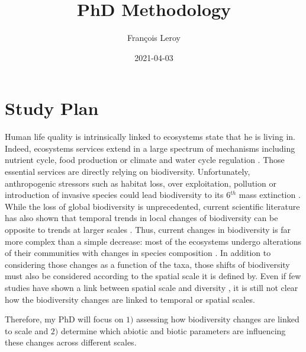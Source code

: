 \documentclass[
  12pt,
  oneside]{report}
\title{PhD Methodology}
\author{François Leroy}
\date{2021-04-03}
\begin{document}
\maketitle

\cleardoublepage 
{}

{
\setcounter{tocdepth}{1}
\tableofcontents
}
\listoffigures
\listoftables
{}


\cleardoublepage 
{}


\hypertarget{study-plan}{%
\chapter{Study Plan}\label{study-plan}}

Human life quality is intrinsically linked to ecosystems state that he is living in. Indeed, ecosystems services extend in a large spectrum of mechanisms including nutrient cycle, food production or climate and water cycle regulation \autocite{pereira_global_2012}. Those essential services are directly relying on biodiversity. Unfortunately, anthropogenic stressors such as habitat loss, over exploitation, pollution or introduction of invasive species could lead biodiversity to its 6\(^{th}\) mass extinction \autocite{barnosky_has_2011}. While the loss of global biodiversity is unprecedented, current scientific literature has also shown that temporal trends in local changes of biodiversity can be opposite to trends at larger scales \autocite{chase_species_2019}. Thus, current changes in biodiversity is far more complex than a simple decrease: most of the ecosystems undergo alterations of their communities with changes in species composition \autocite{blowes_geography_2019,dornelas_assemblage_2014}. In addition to considering those changes as a function of the taxa, those shifts of biodiversity must also be considered according to the spatial scale it is defined by. Even if few studies have shown a link between spatial scale and diversity \autocite{Keil_biogeo_2012}, it is still not clear how the biodiversity changes are linked to temporal or spatial scales.

Therefore, my PhD will focus on \(1)\) assessing how biodiversity changes are linked to scale and \(2)\) determine which abiotic and biotic parameters are influencing these changes across different scales.
\end{document}
